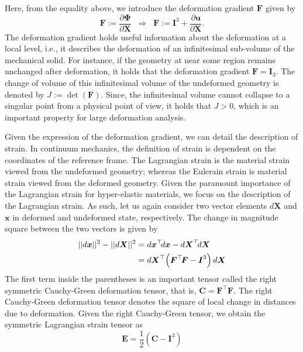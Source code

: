  Here, from the equality above, we introduce the deformation gradient $\boldsymbol{F}$ given by
 \begin{equation}
 	\boldsymbol{F} := \frac{\partial \boldsymbol{\Phi}}{\partial \boldsymbol{X}}\;\; \Rightarrow \;\; \boldsymbol{F}  := \boldsymbol{I}^3 + \frac{\partial \boldsymbol{u} }{ \partial \boldsymbol{X} }.
 \end{equation}
 The deformation gradient holds useful information about the deformation at a local level, i.e., it describes the deformation of an infinitesimal sub-volume of the mechanical solid. For instance, if the geometry at near some region remains unchanged after deformation, it holds that the deformation gradient $\boldsymbol{F} = \boldsymbol{I}_3$. The change of volume of this infinitesimal volume of the undeformed geometry is denoted by $J := \det(\boldsymbol{F})$. Since, the infinitesimal volume cannot collapse to a singular point from a physical point of view, it holds that $J > 0$, which is an important property for large deformation analysis. 

 Given the expression of the deformation gradient, we can detail the description of strain. In continuum mechanics, the definition of strain is dependent on the coordinates of the reference frame. The Lagrangian strain is the material strain viewed from the undeformed geometry; whereas the Eulerain strain is material strain viewed from the deformed geometry. Given the paramount importance of the Lagrangian strain for hyper-elastic materials, we focus on the description of the Lagrangian strain. As such, let us again consider two vector elements $d \boldsymbol{X}$ and $\boldsymbol{x}$ in deformed and undeformed state, respectively. The change in magnitude square between the two vectors is given by
 \begin{align}
 	||d \boldsymbol{x} ||^2 - ||d \boldsymbol{X} ||^2 & = d\boldsymbol{x}^\top  \! d\boldsymbol{x} - d\boldsymbol{X}^\top \! d\boldsymbol{X}  \notag \\
 	& = d\boldsymbol{X}^\top  \! \left( \boldsymbol{F}^\top \! \boldsymbol{F} - \boldsymbol{I}^3 \right)  d\boldsymbol{X}
 \end{align}
The first term inside the parentheses is an important tensor called the right symmetric Cauchy-Green deformation tensor, that is, $\boldsymbol{C} = \boldsymbol{F}^\top \! \boldsymbol{F}$. The right Cauchy-Green deformation tensor denotes the square of local change in distances due to deformation. Given the right Cauchy-Green tensor, we obtain the symmetric Lagrangian strain tensor as
\begin{equation}
	\boldsymbol{E} = \frac{1}{2}\left(\boldsymbol{C} - \boldsymbol{I}^3 \right)
\end{equation}

